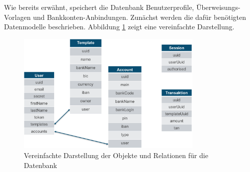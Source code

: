 Wie bereits erwähnt, speichert die Datenbank Benutzerprofile, Überweisungs-Vorlagen und Bankkonten-Anbindungen. Zunächst werden die dafür benötigten Datenmodelle beschrieben. Abbildung \ref{fig:datenbank-modell} zeigt eine vereinfachte Darstellung.

\begin{figure}[!htb]
    \centering
    \includegraphics[width=0.8\textwidth]{bilder/4_datenmodelle.png}
    \caption{Vereinfachte Darstellung der Objekte und Relationen für die Datenbank}
    \label{fig:datenbank-modell}
\end{figure}

